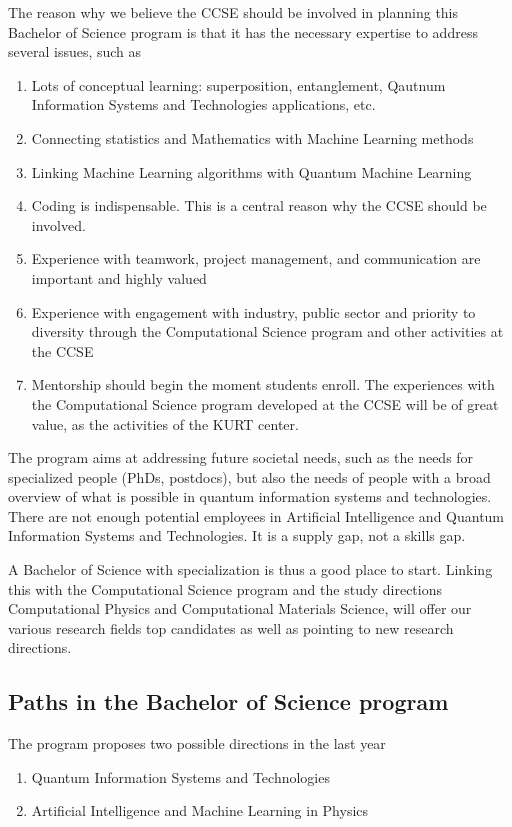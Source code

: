 \documentclass[aps,rmp,preprint,amsmath,amssymb,graphicx,longbibliography]{revtex4-1}
\begin{document}
The reason why we believe the CCSE should be involved in planning this Bachelor of Science program is that it has the necessary expertise to address several issues, such as
\begin{enumerate}
    \item  Lots of conceptual learning: superposition, entanglement, Qautnum Information Systems and Technologies applications, etc. 
    \item Connecting statistics and Mathematics with Machine Learning methods
    \item Linking Machine Learning algorithms with Quantum Machine Learning
\item Coding is indispensable. This is a central reason why the CCSE should be involved.
\item Experience with teamwork, project management, and communication are important and highly valued
\item  Experience with engagement with industry, public sector and priority to diversity through the Computational Science program and other activities at the CCSE
\item  Mentorship should begin the moment students enroll. The experiences with the Computational Science program developed at the CCSE will be of great value, as the activities of the KURT center.
\end{enumerate}

The program aims at addressing future societal needs, such as the  needs for specialized people (PhDs, postdocs), but also the needs of  people with a broad overview of what is possible in  quantum information systems and technologies. There are  not enough potential employees in Artificial Intelligence and Quantum Information Systems and Technologies. It is a supply gap, not a skills gap.

A Bachelor of Science  with specialization  is thus a good place to start. Linking this with the Computational Science program and the study directions Computational Physics and Computational Materials Science, will offer our various research fields top candidates as well as pointing to new research directions. 

\subsection{Paths in the Bachelor of Science program}

The program proposes two possible directions in the last year
\begin{enumerate}
    \item Quantum Information Systems and Technologies
    \item Artificial Intelligence and Machine Learning in Physics
\end{enumerate}
\end{document}
